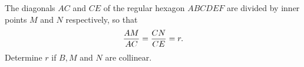 The diagonals $AC$ and $CE$ of the regular hexagon $ABCDEF$ are divided by inner points $M$ and $N$ respectively, so that \[ {AM\over AC}={CN\over CE}=r. \] Determine $r$ if $B,M$ and $N$ are collinear.